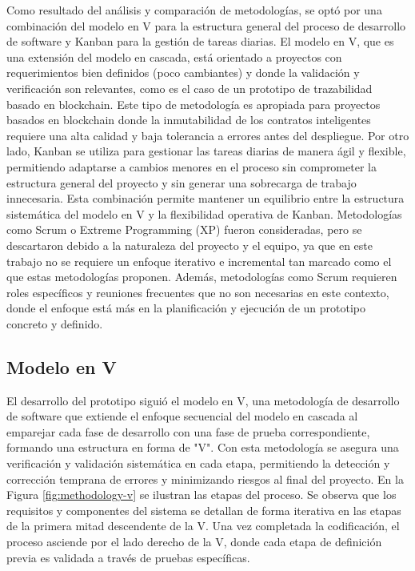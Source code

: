 Como resultado del análisis y comparación de metodologías, se optó por una combinación del modelo en V para la estructura general del proceso de desarrollo de software y Kanban para la gestión de tareas diarias. El modelo en V, que es una extensión del modelo en cascada, está orientado a proyectos con requerimientos bien definidos (poco cambiantes) y donde la validación y verificación son relevantes, como es el caso de un prototipo de trazabilidad basado en blockchain. Este tipo de metodología es apropiada para proyectos basados en blockchain donde la inmutabilidad de los contratos inteligentes requiere una alta calidad y baja tolerancia a errores antes del despliegue. Por otro lado, Kanban se utiliza para gestionar las tareas diarias de manera ágil y flexible, permitiendo adaptarse a cambios menores en el proceso sin comprometer la estructura general del proyecto y sin generar una sobrecarga de trabajo innecesaria. Esta combinación permite mantener un equilibrio entre la estructura sistemática del modelo en V y la flexibilidad operativa de Kanban. Metodologías como Scrum o Extreme Programming (XP) fueron consideradas, pero se descartaron debido a la naturaleza del proyecto y el equipo, ya que en este trabajo no se requiere un enfoque iterativo e incremental tan marcado como el que estas metodologías proponen. Además, metodologías como Scrum requieren roles específicos y reuniones frecuentes que no son necesarias en este contexto, donde el enfoque está más en la planificación y ejecución de un prototipo concreto y definido.

\subsection{Modelo en V}

El desarrollo del prototipo siguió el modelo en V, una metodología de desarrollo de software que extiende el enfoque secuencial del modelo en cascada al emparejar cada fase de desarrollo con una fase de prueba correspondiente, formando una estructura en forma de "V". Con esta metodología se asegura una verificación y validación sistemática en cada etapa, permitiendo la detección y corrección temprana de errores y minimizando riesgos al final del proyecto. En la Figura \ref{fig:methodology-v} se ilustran las etapas del proceso. Se observa que los requisitos y componentes del sistema se detallan de forma iterativa en las etapas de la primera mitad descendente de la V. Una vez completada la codificación, el proceso asciende por el lado derecho de la V, donde cada etapa de definición previa es validada a través de pruebas específicas.

